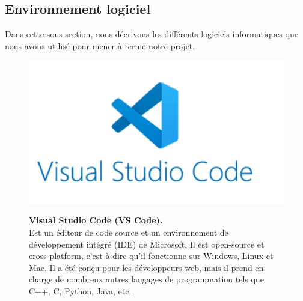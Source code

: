 \subsection{Environnement logiciel}
Dans cette sous-section, nous décrivons les différents logiciels informatiques
que nous avons utilisé pour mener à terme notre projet.
\begin{figure}[H]
    \centering
    \begin{minipage}[c]{0.3\textwidth}
      \includegraphics[width=\linewidth]{projet/images/diagramme de sequance/images/vs code.png}
    \end{minipage}
    \hspace{1cm}
    \begin{minipage}[c]{0.6\textwidth}
        \textbf{Visual Studio Code (VS Code).}\\[0.5em]
        Est un éditeur de code source et un environnement de développement intégré (IDE) de Microsoft. Il est open-source et cross-platform, c’est-à-dire qu’il fonctionne sur Windows, Linux et Mac. Il a été conçu pour les développeurs web, mais il prend en charge de nombreux autres langages de programmation tels que C++, C, Python, Java, etc.
    \end{minipage}
\end{figure}

\vspace{0.5cm}

